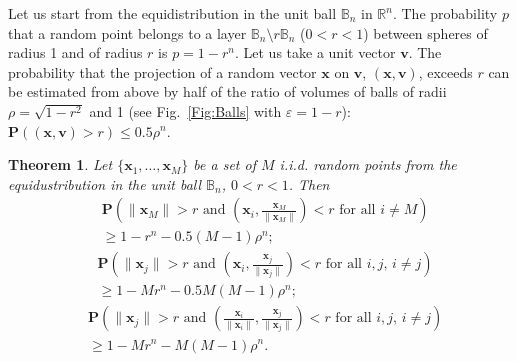 \documentclass[final,5p,times,twocolumn]{elsarticle}
\newtheorem{theorem}{Theorem}
\begin{document}
Let us start from the equidistribution in the unit ball $\mathbb{B}_n$ in $\mathbb{R}^n$. The probability $p$ that a random point belongs to a layer $\mathbb{B}_n \setminus r\mathbb{ B}_n$ ($0<r<1$) between spheres of radius 1 and of radius $r$ is $p=1-r^n$. Let us take a unit vector $ \boldsymbol{v}$. The probability that the projection of a random vector $\boldsymbol{x}$ on $ \boldsymbol{v}$, $( \boldsymbol{x}, \boldsymbol{v})$, exceeds $r$ can be estimated from above by half of the ratio of volumes of balls of radii $\rho=\sqrt{1-r^2}$ and 1 (see  Fig.~\ref{Fig:Balls} with $\varepsilon=1-r$): $ \mathbf{P}(( \boldsymbol{x}, \boldsymbol{v})>r)\leq 0.5 \rho^{n}$.

\begin{theorem}\label{ball1point}
Let $\{\boldsymbol{x}_1, \ldots , \boldsymbol{x}_M\}$ be a set of $M$  i.i.d. random points  from the equidustribution in the unit ball $\mathbb{B}_n$, $0<r<1$. Then
\begin{equation}\label{Eq:ball1}
\begin{split}
&\mathbf{P}\left(\|\boldsymbol{x}_M\|>r \mbox{ and } \left(\boldsymbol{x}_i,\frac{\boldsymbol{x}_M}{\| \boldsymbol{x}_M\| }\right)<r \mbox{ for all } i\neq M \right)\\
&   \geq 1-r^n-0.5(M-1) \rho^{n};
\end{split}
\end{equation}
\begin{equation}\label{Eq:ballM}
\begin{split}
&\mathbf{P}\left(\|\boldsymbol{x}_j\|>r  \mbox{ and } \left(\boldsymbol{x}_i,\frac{\boldsymbol{x}_j}{\| \boldsymbol{x}_j\|}\right)<r \mbox{ for all } i,j, \, i\neq j\right)\\
&   \geq  1-Mr^n-0.5M(M-1)\rho^{n};
\end{split}
\end{equation}
\begin{equation}\label{Eq:ballMangle}
\begin{split}
&\mathbf{P}\left(\|\boldsymbol{x}_j\|>r  \mbox{ and } \left(\frac{\boldsymbol{x}_i}{\| \boldsymbol{x}_i\|},\frac{\boldsymbol{x}_j}{\| \boldsymbol{x}_j\|}\right)<r \mbox{ for all } i,j, \,i\neq j\right)\\
&  \geq  1-Mr^n-M(M-1)\rho^{n}.
\end{split}
\end{equation}
\end{theorem}
\end{document}
